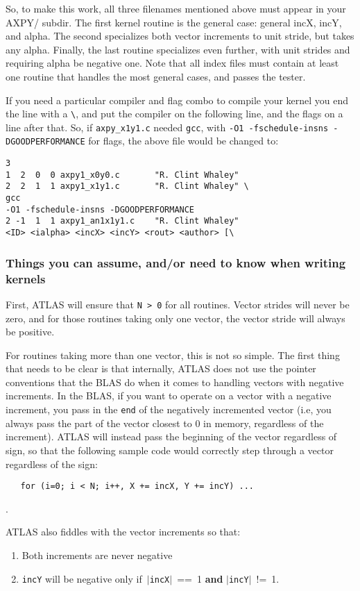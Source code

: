 \documentclass[11pt]{article}
\begin{document}
So, to make this work, all three filenames mentioned above must appear in
your {AXPY/} subdir.  The first kernel routine is the general case:
general incX, incY, and alpha.  The second specializes both vector increments
to unit stride, but takes any alpha.  Finally, the last routine specializes
even further, with unit strides and requiring alpha be negative one.  
Note that all index files must contain at least one routine that handles
the most general cases, and passes the tester.

If you need a particular compiler and flag combo to compile your kernel
you end the line with a \verb+\+, and put the compiler on the following line,
and the flags on a line after that.  So, if {\tt axpy\_x1y1.c} needed {\tt gcc},
with {\tt -O1 -fschedule-insns -DGOODPERFORMANCE} for flags, the above
file would be changed to:
\begin{verbatim}
3
1  2  0  0 axpy1_x0y0.c       "R. Clint Whaley"
2  2  1  1 axpy1_x1y1.c       "R. Clint Whaley" \
gcc
-O1 -fschedule-insns -DGOODPERFORMANCE
2 -1  1  1 axpy1_an1x1y1.c    "R. Clint Whaley"
<ID> <ialpha> <incX> <incY> <rout> <author> [\
\end{verbatim}
\subsubsection{Things you can assume, and/or need to know when writing kernels}
First, ATLAS will ensure that {\tt N > 0} for all routines.  Vector
strides will never be zero, and for those routines taking only one vector,
the vector stride will always be positive.

For routines taking more than one vector, this is not so simple.  The first
thing that needs to be clear is that internally, ATLAS does not use the
pointer conventions that the BLAS do when it comes to handling vectors
with negative increments.  In the BLAS, if you want to operate on a vector
with a negative increment, you pass in the {\tt end} of the negatively
incremented vector (i.e, you always pass the part of the vector closest
to 0 in memory, regardless of the increment).  ATLAS will instead pass
the beginning of the vector regardless of sign, so that the following
sample code would correctly step through a vector regardless of the sign:
\begin{verbatim}
   for (i=0; i < N; i++, X += incX, Y += incY) ...
\end{verbatim}.

ATLAS also fiddles with the vector increments so that:
\begin{enumerate}
 \item Both increments are never negative
 \item {\tt incY} will be negative only if~$|${\tt incX}$|$~==~1 {\bf and}
       $|${\tt incY}$|$~!=~1.
\end{enumerate}
\end{document}
